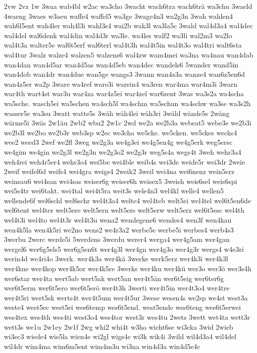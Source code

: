 {2vw
2vz
1w
3waa
wab4bl
w2ac
wa3cho
3wacht
wach6tra
wach6trä
wa3chu
3waeld
4waeng
3waes
w3aeu
waffe4
waffel5
wa3ge
3wage4n3
wa2g3n
3wah
wahlen4
wah6l5ent
wah4ler
wah4l3i
wahl3s4
wai2b
wak3l
wa3la5c
3wald
wal4d3a4
wal4dec
wal4del
wal6denk
wal4din
wal4d3r
wa3le.
wa4les
walf2
wa3li
wal2m3
wa2lo
wal4t3a
walter5e
wal6t5erf
wal6terl
wal4t3h
wal4t5in
wal4t3o
wal4tri
walt6sta
wal4tur
3walz
walze4
walzen5
walzens6
wal4zw
wam4mei
wa3na
wa4nau
wan4dab
wan4dan
wan4d5ar
wan4d5as
wan4d5eb
wan4dec
wandels6
5wander
wand5in
wan4dob
wan4dr
wan4due
wan5ge
wangs3
3wann
wan4z3a
wanze4
wan6z5en6d
wan4z5er
wa2p
3ware
wa4ref
ware3i
warein4
wa3ren
war4ma
war4m3i
3warn
war4th
wart4st
war3u
war4za
war4z5ei
war4zel
war6zent
3was
wa3s2a
wa4scha
wa5sche.
wasch5ei
wa5schen
wa4sch5l
wa4schm
wa5schun
wa4schw
wa3se
wa3s2h
wasser5e
wa3su
3watt
watte5s
3wäh
wäh4lei
wäh3ri
3wäld
wände5s
2wäng
wärme5i
3wäs
2w1äu
2wb2
wbu2
2w1c
2wd
we2a
we2b3a
webeat5
webe3e
we2b3i
we2b3l
we2bo
we2b3r
web3sp
w2ec
we3cha
we5cke.
we5cken.
we5ckes
wecks4
wee2
weed3
2wef
we2fl
3weg
we2g3a
we4g3ei
we4g5en4g
we4g5erk
weg5ersc
we4gim
we4gin
we2g3l
we2g3n
we2g3o2
we2g3r
weg5s4a
wegs4t
3weh
wehr3a4
weh4rei
weh4r5er4
wehr3o4
wei5be
wei4ble
weib4s
wei3de
weide5r
wei3dr
2weie
2weif
weifel6d
weifs4
wei4gra
weigs4
2weik2
3weil
wei4na
wei6nenz
wein5erz
weinsau6
wei4san
wei4sas
weiser6g
weiser6h
weisex5
3weish
weis6sel
weis6spi
wei5s4tr
wei6takt.
wei4tal
wei4t5ra
weit3s
wele4n3
wel4kl
welle4
wellen5
wellende6f
wel6schl
wel6schr
wel4t3a4
welte4
wel4teb
welt5ei
wel4tel
wel6t5en6de
wel6tent
wel4ter
welt5ere
welt5ern
welt5ers
welt5erw
welt5erz
wel6t5esc
wel4th
wel4t3i
wel4to
wel4t3r
wel4t3u
wena2
wendegene6
wendes4
wen3f
wen4kau
wen4k5la
wen4k5ri
we2no
wens2
we4r3a2
werbe5e
werbe5i
werbes4
werb4s3
3werbu
2werc
werde5i
5werdens
3werdu
werer4
werga4
wer4g5am
wer4gan
wergel6
wer6g5els5
wer6g5en6t
wer4g3l
wer4gn
wer4g3o
wer4g3r
wergs4
w4e3ri
werin4d
we4ri4o
3werk.
wer4k3a
wer4kä
3werke
werk5erz
wer4k3i
wer4k3l
wer4kne
wer4kop
wer4k5or
wer4k5re
3werks
wer4ku
wer4kü
wer3o
wer3ö
wer3s4h
wer6star
wer4ta
wert5ab
wert5ak
wert5an
wer4t5än
wer6t5eig
wer6ter6g
wer6t5erm
wer6t5ero
wer6t5erö
wer4t3h
3werti
wer4t5in
wer4t3o4
wer4tre
wer4t5ri
wert5sk
werts4t
wer4t5um
wer4t5ur
3wese
wesen4s
we2sp
we4st
west3a
weste4
west5ec
west5ei
wes6temp
wes6t5end.
west5ende
wes6teng
wes6t5erwei
wes4tex
wes4th
wes4ti
west3o4
wes4tor
west3r
wes4tu
2wets
3wett
wet4ta
wett3r
wett3s
we1u
2w1ey
2w1f
2wg
whi2
whi4t
w3ho
wicht6se
wi3cka
3wid
2wieb
wi3ec3
wiede4
wie5la
wien4e
wi2gl
wigs4c
wi3k
wik4i
3wild
wil4d3a4
wil4del
wil4dr
wim4ma
wim6m5ent
wim4m3u
wi3na
win4d3a
win4d5e4c
}
